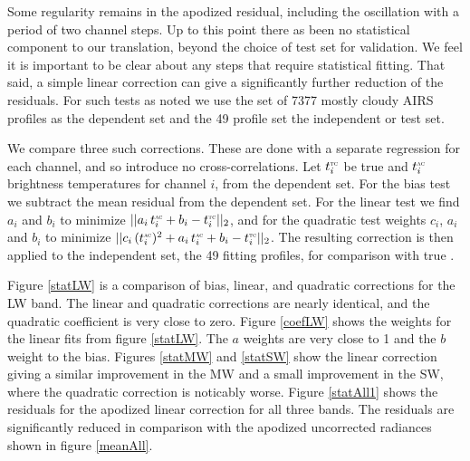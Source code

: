 \documentclass[10pt,twocolumn]{article}  %
\begin{document}
Some regularity remains in the apodized residual, including the
oscillation with a period of two channel steps.  Up to this point
there as been no statistical component to our translation, beyond
the choice of test set for validation.  We feel it is important to
be clear about any steps that require statistical fitting.  That
said, a simple linear correction can give a significantly further
reduction of the residuals.  For such tests as noted we use the set
of 7377 mostly cloudy AIRS profiles as the dependent set and the 49
profile set the independent or test set.

We compare three such corrections.  These are done with a separate
regression for each {\cris} channel, and so introduce no
cross-correlations.  Let $t^{\mbox{\tiny\textsc{tc}}}_i$ be true {\cris} and $t^{\mbox{\tiny\textsc{ac}}}_i$
{\airs} {\cris} brightness temperatures for {\cris} channel $i$,
from the dependent set.  For the bias test we subtract the mean
residual from the dependent set.  For the linear test we find $a_i$
and $b_i$ to minimize $||a_i\,t^{\mbox{\tiny\textsc{ac}}}_i + b_i - t^{\mbox{\tiny\textsc{tc}}}_i||_2$, and for
the quadratic test weights $c_i$, $a_i$ and $b_i$ to minimize
$||c_i\,(t^{\mbox{\tiny\textsc{ac}}}_i)^2 + a_i\,t^{\mbox{\tiny\textsc{ac}}}_i + b_i - t^{\mbox{\tiny\textsc{tc}}}_i||_2$.  The resulting
correction is then applied to the independent set, the 49 fitting
profiles, for comparison with true {\cris}.

Figure \ref{statLW} is a comparison of bias, linear, and quadratic
corrections for the LW band.  The linear and quadratic corrections
are nearly identical, and the quadratic coefficient is very close to
zero.  Figure \ref{coefLW} shows the weights for the linear fits
from figure \ref{statLW}.  The $a$ weights are very close to 1 and
the $b$ weight to the bias.  Figures \ref{statMW} and \ref{statSW}
show the linear correction giving a similar improvement in the MW
and a small improvement in the SW, where the quadratic correction is
noticably worse.  Figure \ref{statAll1} shows the residuals for the
apodized linear correction for all three bands.  The residuals are
significantly reduced in comparison with the apodized uncorrected
radiances shown in figure \ref{meanAll}.

\end{document}
